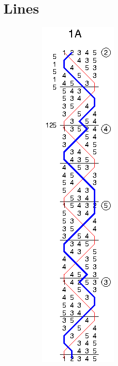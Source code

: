 \chapter{Lines} \label{cha:lines}

\begin{figure}[t]
  \centering
  \begin{subfigure}{0.24\textwidth}
    \includegraphics{figs/methods/single-hunt/1A}
  \end{subfigure}
  \begin{subfigure}{0.24\textwidth}

\end{subfigure}
\end{figure}
